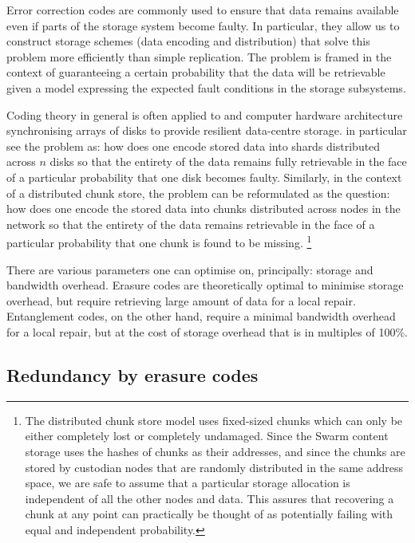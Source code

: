 Error correction codes are commonly used to ensure that data remains available even if parts of the storage system become faulty. In particular, they allow us to construct storage schemes (data encoding and distribution) that solve this problem more efficiently than simple replication. The problem is framed in the context of guaranteeing a certain probability that the data will be retrievable given a model expressing the expected fault conditions in the storage subsystems.

Coding theory in general is often applied to  and computer hardware architecture synchronising arrays of disks to provide resilient data-centre storage.
 in particular see the problem as: how does one encode stored data into shards distributed across $n$ disks so that the entirety of the data remains fully retrievable in the face of a particular probability that one disk becomes faulty.
Similarly, in the context of a distributed chunk store, the problem can be reformulated as the question: how does one encode the stored data into chunks distributed across nodes in the network so that the entirety of the data remains retrievable in the face of a particular probability that one chunk is found to be missing.%
%
\footnote{The distributed chunk store model uses fixed-sized chunks which can only be either completely lost or completely undamaged. Since the Swarm content storage uses the hashes of chunks as their addresses, and since the chunks are stored by custodian nodes that are randomly distributed in the same address space, we are safe to assume that a particular storage allocation is independent of all the other nodes and data. This assures that recovering a chunk at any point can practically be thought of as potentially failing with equal and independent probability.}

There are various parameters one can optimise on, principally: storage and bandwidth overhead. Erasure codes are theoretically optimal to minimise storage overhead, but require retrieving large amount of data for a local repair.
Entanglement codes, on the other hand, require a minimal bandwidth overhead for a local repair, but at the cost of storage overhead that is in multiples of 100\%. 

\subsection{Redundancy by erasure codes \statusgreen}\label{sec:erasure}


